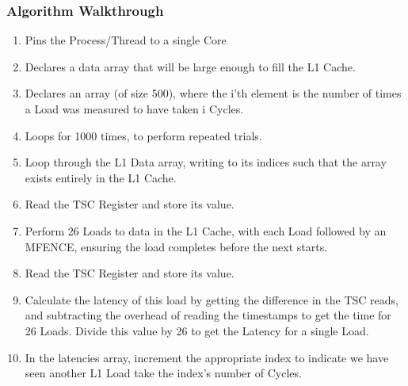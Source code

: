 \documentclass[bsc,frontabs,twoside,singlespacing,parskip,deptreport]{infthesis}     %
\begin{document}
\subsubsection{Algorithm Walkthrough}
\begin{enumerate}
    \item Pins the Process/Thread to a single Core
    \item Declares a data array that will be large enough to fill the L1 Cache.
    \item Declares an array (of size 500), where the i'th element is the number of times a Load was measured to have taken i Cycles.
    \item Loops for 1000 times, to perform repeated trials.
    \item Loop through the L1 Data array, writing to its indices such that the array exists entirely in the L1 Cache.
    \item Read the TSC Register and store its value.
    \item Perform 26 Loads to data in the L1 Cache, with each Load followed by an MFENCE\cite{mfence_spec}, ensuring the load completes before the next starts.
    \item Read the TSC Register and store its value.
    \item Calculate the latency of this load by getting the difference in the TSC reads, and subtracting the overhead of reading the timestamps to get the time for 26 Loads. Divide this value by 26 to get the Latency for a single Load.
    \item In the latencies array, increment the appropriate index to indicate we have seen another L1 Load take the index's number of Cycles.
\end{enumerate}
\end{document}
